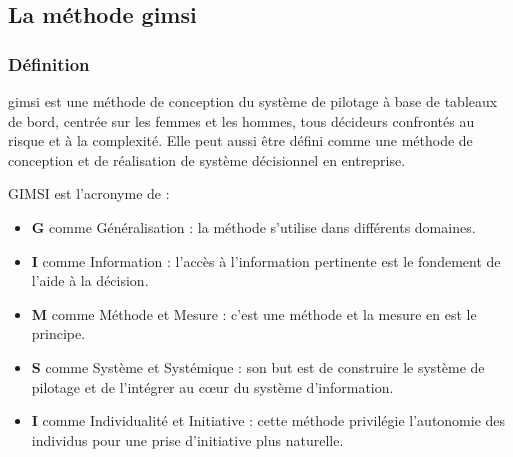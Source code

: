         \subsection[La méthode GIMSI]{La méthode \acrshort{gimsi}}
            \subsubsection[Définition]{Définition}
            \acrshort*{gimsi} est une méthode de conception du système de pilotage à base 
            de tableaux de bord, centrée sur les femmes et les hommes,
            tous décideurs confrontés au risque et à la complexité. \cite*{fernandez2021gimsi} Elle
            peut aussi être défini comme une méthode de conception et de réalisation de
            système décisionnel en entreprise.
            \par
            GIMSI est l’acronyme de :
            \par
            \begin{itemize}
                \setlength{\itemsep}{0pt}
                \item [\ding{226}] \textbf{G} comme Généralisation :
                la méthode s’utilise dans différents domaines.
                \item [\ding{226}] \textbf{I} comme Information : l’accès à l’information
                pertinente est le fondement de l’aide à la décision.
                \item [\ding{226}] \textbf{M} comme Méthode et Mesure : c’est une méthode
                et la mesure en est le principe.
                \item [\ding{226}] \textbf{S} comme Système et Systémique : son but est de construire le système de pilotage
                et de l’intégrer au cœur du système d’information.
                \item [\ding{226}] \textbf{I} comme Individualité et Initiative : cette méthode privilégie
                l’autonomie des individus pour une prise d’initiative plus naturelle.
            \end{itemize}
